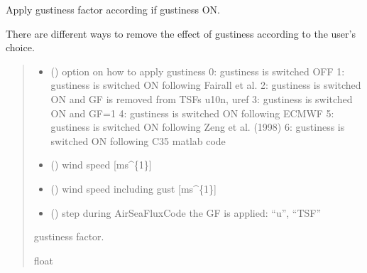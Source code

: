 \documentclass[letterpaper,10pt,english]{sphinxmanual}
\begin{document}
\begin{fulllineitems}
\label{\detokenize{users_guide:AirSeaFluxCode.flux_subs.apply_GF}}
\pysigstartsignatures
\pysiglinewithargsret
{}
{\sphinxparamcomma {}\sphinxparamcomma {}\sphinxparamcomma {}}
{}
\pysigstopsignatures
\sphinxAtStartPar
Apply gustiness factor according if gustiness ON.

\sphinxAtStartPar
There are different ways to remove the effect of gustiness according to
the user’s choice.
\begin{quote}\begin{description}
\begin{itemize}
\item {}
\sphinxAtStartPar
{} () \textendash{} option on how to apply gustiness
0: gustiness is switched OFF
1: gustiness is switched ON following Fairall et al.
2: gustiness is switched ON and GF is removed from TSFs u10n, uref
3: gustiness is switched ON and GF=1
4: gustiness is switched ON following ECMWF
5: gustiness is switched ON following Zeng et al. (1998)
6: gustiness is switched ON following C35 matlab code

\item {}
\sphinxAtStartPar
{} () \textendash{} wind speed                      {[}ms\textasciicircum{}\{\sphinxhyphen{}1\}{]}

\item {}
\sphinxAtStartPar
{} () \textendash{} wind speed including gust       {[}ms\textasciicircum{}\{\sphinxhyphen{}1\}{]}

\item {}
\sphinxAtStartPar
{} () \textendash{} step during AirSeaFluxCode the GF is applied: “u”, “TSF”

\end{itemize}

\sphinxAtStartPar
{} \textendash{} gustiness factor.

\sphinxAtStartPar
float

\end{description}\end{quote}

\end{fulllineitems}
\end{document}
